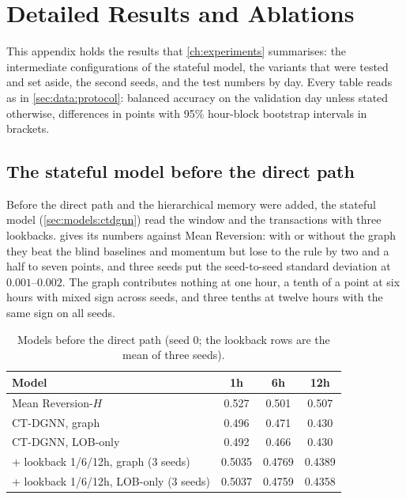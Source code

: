 \chapter{Detailed Results and Ablations}
\label{app:results}

This appendix holds the results that \cref{ch:experiments} summarises: the intermediate
configurations of the stateful model, the variants that were tested and set aside, the second
seeds, and the test numbers by day.  Every table reads as in \cref{sec:data:protocol}:
balanced accuracy on the validation day unless stated otherwise, differences in points with
95\% hour-block bootstrap intervals in brackets.

\section{The stateful model before the direct path}
\label{app:results:first}

Before the direct path and the hierarchical memory were added, the stateful model
(\cref{sec:models:ctdgnn}) read the window and the transactions with three lookbacks.
 gives its numbers against Mean Reversion: with or without the
graph they beat the blind baselines and momentum but lose to the rule by two and a half to
seven points, and three seeds put the seed-to-seed standard deviation at $0.001$--$0.002$.  The
graph contributes nothing at one hour, a tenth of a point at six hours with mixed sign
across seeds, and three tenths at twelve hours with the same sign on all seeds.

\begin{table}[t]
\centering
\caption{Models before the direct path (seed 0; the lookback rows are the mean of three seeds).}
\label{tab:exp:retrain}
\begin{fittable}\begin{tabular}{lccc}
\toprule
Model & 1h & 6h & 12h \\
\midrule
Mean Reversion-$H$                    & 0.527 & 0.501 & 0.507 \\
CT-DGNN, graph                        & 0.496 & 0.471 & 0.430 \\
CT-DGNN, LOB-only                     & 0.492 & 0.466 & 0.430 \\
+ lookback 1/6/12h, graph (3 seeds)   & 0.5035 & 0.4769 & 0.4389 \\
+ lookback 1/6/12h, LOB-only (3 seeds) & 0.5037 & 0.4759 & 0.4358 \\
\bottomrule
\end{tabular}\end{fittable}
\end{table}

